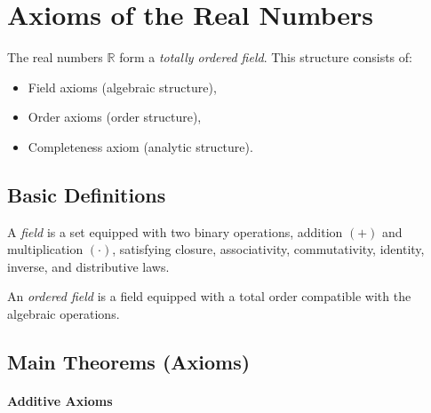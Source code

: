 
\section{Axioms of the Real Numbers}

\begin{exposition}
The real numbers $\mathbb{R}$ form a \emph{totally ordered field}.
This structure consists of:
\end{exposition}

\begin{itemize}
\item Field axioms (algebraic structure),
\item Order axioms (order structure),
\item Completeness axiom (analytic structure).
\end{itemize}

\subsection*{Basic Definitions}

\begin{remark*}
A \emph{field} is a set equipped with two binary operations,
addition $(+)$ and multiplication $(\cdot)$,
satisfying closure, associativity, commutativity,
identity, inverse, and distributive laws.

An \emph{ordered field} is a field equipped with a total order
compatible with the algebraic operations.
\end{remark*}

\subsection*{Main Theorems (Axioms)}


\paragraph{Additive Axioms}

